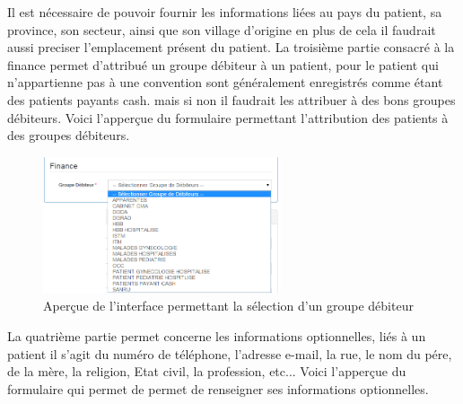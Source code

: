 \documentclass[12pt,a4paper]{report}
\begin{document}
Il est nécessaire de pouvoir fournir les informations liées au pays du patient, sa province, son secteur, ainsi que son village d'origine en plus de cela il faudrait aussi preciser l'emplacement présent du patient.
\newpage
La troisième partie consacré à la finance permet d'attribué un groupe débiteur à un patient, pour le patient qui n'appartienne pas à une convention sont généralement enregistrés comme étant des patients payants cash. mais si non il faudrait les attribuer à des bons groupes débiteurs. Voici l'apperçue du formulaire permettant l'attribution des patients à des groupes débiteurs.

\begin{figure}[h]
\begin{center}
\includegraphics[width=7cm]{pic/SelectGrDebiteur.png}
\end{center}
\caption{Aperçue de l'interface permettant la sélection d'un groupe débiteur}
\label{Aperçue de l'interface permettant la sélection d'un groupe débiteur}
\end{figure} 
 
La quatrième partie permet concerne les informations optionnelles, liés à un patient il s'agit du numéro de téléphone, l'adresse e-mail, la rue, le nom du pére, de la mère, la religion, Etat civil, la profession, etc...
Voici l'apperçue du formulaire qui permet de permet de renseigner ses informations optionnelles.
\end{document}

